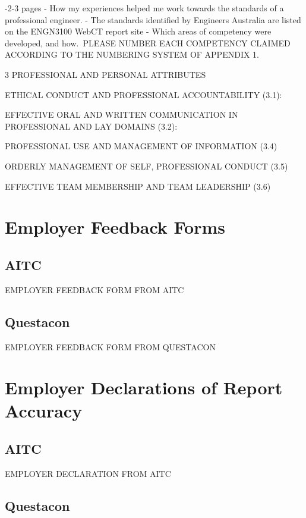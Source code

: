 \documentclass[11pt]{article}
\begin{document}
-2-3 pages
- How my experiences helped me work towards the standards of a
professional engineer.
- The standards identified by Engineers Australia are listed on the ENGN3100
WebCT report site
- Which areas of competency were developed, and how.\
PLEASE NUMBER EACH COMPETENCY CLAIMED ACCORDING TO THE
NUMBERING SYSTEM OF APPENDIX 1.


3 PROFESSIONAL AND PERSONAL ATTRIBUTES

ETHICAL CONDUCT AND PROFESSIONAL ACCOUNTABILITY (3.1):


EFFECTIVE ORAL AND WRITTEN COMMUNICATION IN PROFESSIONAL AND LAY DOMAINS (3.2):

PROFESSIONAL USE AND MANAGEMENT OF INFORMATION (3.4)


ORDERLY MANAGEMENT OF SELF, PROFESSIONAL CONDUCT (3.5)


EFFECTIVE TEAM MEMBERSHIP AND TEAM LEADERSHIP (3.6)


\newpage

\section{Employer Feedback Forms}

\subsection{AITC}

EMPLOYER FEEDBACK FORM FROM AITC

\newpage

\subsection{Questacon}

EMPLOYER FEEDBACK FORM FROM QUESTACON

\newpage

\section{Employer Declarations of Report Accuracy}

\subsection{AITC}

EMPLOYER DECLARATION FROM AITC

\newpage

\subsection{Questacon}
\end{document}
